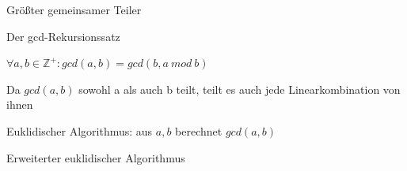 \documentclass[a4paper]{article}
\begin{document}
\begin{multicols}{3}
      Größter gemeinsamer Teiler
      \begin{itemize*}
            \item Der gcd-Rekursionssatz
            \begin{itemize*}
                  \item $\forall a, b \in \mathbb{Z}^+: gcd(a, b) = gcd(b, a\ mod\ b)$
                  \item Da $gcd(a, b)$ sowohl a als auch b teilt, teilt es auch jede Linearkombination von ihnen%
            \end{itemize*}
            \item Euklidischer Algorithmus: aus $a, b$ berechnet $gcd(a, b)$
            \item Erweiterter euklidischer Algorithmus%

\end{itemize*}
\end{multicols}
\end{document}
